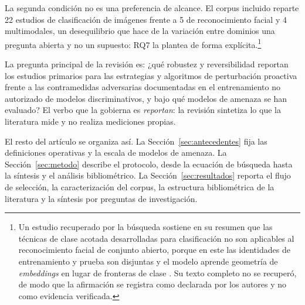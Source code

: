 \documentclass[pdflatex,sn-mathphys-num]{sn-jnl}
\theoremstyle{thmstyleone}
\theoremstyle{thmstyletwo}
\theoremstyle{thmstylethree}
\begin{document}
La segunda condición no es una preferencia de alcance. El corpus incluido reparte 22 estudios de clasificación de imágenes frente a 5 de reconocimiento facial y 4 multimodales, un desequilibrio que hace de la variación entre dominios una pregunta abierta y no un supuesto: RQ7 la plantea de forma explícita.\footnote{Un estudio recuperado por la búsqueda sostiene en su resumen que las técnicas de clase acotada desarrolladas para clasificación no son aplicables al reconocimiento facial de conjunto abierto, porque en este las identidades de entrenamiento y prueba son disjuntas y el modelo aprende geometría de \emph{embeddings} en lugar de fronteras de clase \cite{paik2026toward}. Su texto completo no se recuperó, de modo que la afirmación se registra como declarada por los autores y no como evidencia verificada.}

La pregunta principal de la revisión es: ¿qué robustez y reversibilidad reportan los estudios primarios para las estrategias y algoritmos de perturbación proactiva frente a las contramedidas adversarias documentadas en el entrenamiento no autorizado de modelos discriminativos, y bajo qué modelos de amenaza se han evaluado? El verbo que la gobierna es \emph{reportan}: la revisión sintetiza lo que la literatura mide y no realiza mediciones propias.

El resto del artículo se organiza así. La Sección~\ref{sec:antecedentes} fija las definiciones operativas y la escala de modelos de amenaza. La Sección~\ref{sec:metodo} describe el protocolo, desde la ecuación de búsqueda hasta la síntesis y el análisis bibliométrico. La Sección~\ref{sec:resultados} reporta el flujo de selección, la caracterización del corpus, la estructura bibliométrica de la literatura y la síntesis por preguntas de investigación.
\end{document}
